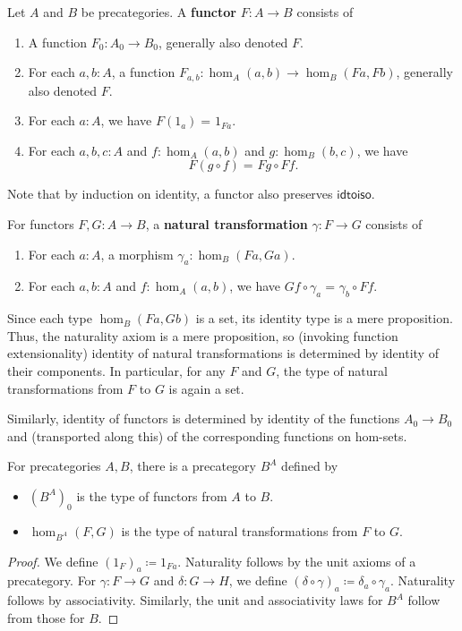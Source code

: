 \documentclass{amsart}
\newcommand{\defeq}{\coloneqq}  %
\newcommand{\id}[3][]{\ensuremath{#2 =_{#1} #3}\xspace}
\theoremstyle{definition}
\theoremstyle{remark}
\numberwithin{equation}{section}
\newcommand{\idtoiso}{\ensuremath{\mathsf{idtoiso}}\xspace}
\begin{document}
\begin{defn}\label{ct:functor}
  Let $A$ and $B$ be precategories.
  A \textbf{functor} $F:A\to B$ consists of
  \begin{enumerate}
  \item A function $F_0:A_0\to B_0$, generally also denoted $F$.
  \item For each $a,b:A$, a function $F_{a,b}:\hom_A(a,b) \to \hom_B(Fa,Fb)$, generally also denoted $F$.
  \item For each $a:A$, we have $\id{F(1_a)}{1_{Fa}}$.
  \item For each $a,b,c:A$ and $f:\hom_A(a,b)$ and $g:\hom_B(b,c)$, we have
    \[\id{F(g\circ f)}{Fg\circ Ff}.\]
  \end{enumerate}
\end{defn}

Note that by induction on identity, a functor also preserves \idtoiso.

\begin{defn}\label{ct:nattrans}
  For functors $F,G:A\to B$, a \textbf{natural transformation} $\gamma:F\to G$ consists of
  \begin{enumerate}
  \item For each $a:A$, a morphism $\gamma_a:\hom_B(Fa,Ga)$.
  \item For each $a,b:A$ and $f:\hom_A(a,b)$, we have $\id{Gf\circ \gamma_a}{\gamma_b\circ Ff}$.
  \end{enumerate}
\end{defn}

Since each type $\hom_B(Fa,Gb)$ is a set, its identity type is a mere proposition.
Thus, the naturality axiom is a mere proposition, so (invoking function extensionality) identity of natural transformations is determined by identity of their components.
In particular, for any $F$ and $G$, the type of natural transformations from $F$ to $G$ is again a set.

Similarly, identity of functors is determined by identity of the functions $A_0\to B_0$ and (transported along this) of the corresponding functions on hom-sets.

\begin{defn}\label{ct:functor-precat}
  For precategories $A,B$, there is a precategory $B^A$ defined by
  \begin{itemize}
  \item $(B^A)_0$ is the type of functors from $A$ to $B$.
  \item $\hom_{B^A}(F,G)$ is the type of natural transformations from $F$ to $G$.
  \end{itemize}
\end{defn}
\begin{proof}
  We define $(1_F)_a\defeq 1_{Fa}$.
  Naturality follows by the unit axioms of a precategory.
  For $\gamma:F\to G$ and $\delta:G\to H$, we define $(\delta\circ\gamma)_a\defeq \delta_a\circ \gamma_a$.
  Naturality follows by associativity.
  Similarly, the unit and associativity laws for $B^A$ follow from those for $B$.
\end{proof}
\end{document}
